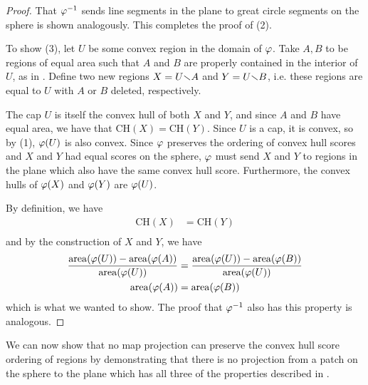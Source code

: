 \begin{proof}
		That $\varphi^{-1}$ sends line segments in the plane to great circle segments on the sphere is shown analogously.  
		This completes the proof of (2).
		
		
		
 To show (3), let $U$ be some convex region in the domain of $\varphi$.  Take $A,B$ to be regions of equal area such that $A$ and $B$ are properly contained in the interior of $U$, as in .  Define two new regions $X=U{\smallsetminus} A$ and $Y=U{\smallsetminus} B$, i.e. these regions are equal to $U$ with $A$ or $B$ deleted, respectively.  

The cap $U$ is itself the convex hull of both $X$ and $Y$, and since $A$ and $B$ have equal area, we have that $\mathrm{CH}(X) = \mathrm{CH}(Y)$.  Since $U$ is a cap, it is convex, so by (1), $\varphi(U)$ is also convex.  Since $\varphi$ preserves the ordering of convex hull scores and $X$ and $Y$ had equal scores on the sphere, $\varphi$ must send $X$ and $Y$ to regions in the plane which also have the same convex hull score.  Furthermore, the convex hulls of $\varphi(X)$ and $\varphi(Y)$ are $\varphi(U)$.

By definition, we have
\begin{align*}
\mathrm{CH}(X) &= \mathrm{CH}(Y)\\
\end{align*}
and by the construction of $X$ and $Y$, we have 
\begin{align*}
\frac{\mathrm{area}(\varphi(U)) - \mathrm{area}(\varphi(A))}{\mathrm{area}(\varphi(U))} &= \frac{\mathrm{area}(\varphi(U)) - \mathrm{area}(\varphi(B))}{\mathrm{area}(\varphi(U))}\\
\mathrm{area}(\varphi(A)) &= \mathrm{area}(\varphi(B))
\end{align*}
 which is what we wanted to show.  The proof that $\varphi^{-1}$ also has this property is analogous.

\end{proof}

We can now show that no map projection can preserve the convex hull score ordering of regions by demonstrating that there is no projection from a patch on the sphere to the plane which has all three of the properties described  in . 


